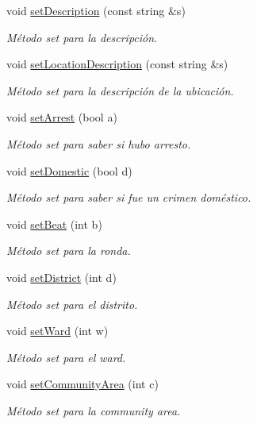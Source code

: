 \begin{DoxyCompactItemize}
void \hyperlink{classcrimen_a49fdeeb1b6376fd78bce80e42f670d43}{set\-Description} (const string \&s)
\begin{DoxyCompactList}\small\item\em Método set para la descripción. \end{DoxyCompactList}\item 
void \hyperlink{classcrimen_ad3bd97ed5867e3961a77f64a15797e41}{set\-Location\-Description} (const string \&s)
\begin{DoxyCompactList}\small\item\em Método set para la descripción de la ubicación. \end{DoxyCompactList}\item 
void \hyperlink{classcrimen_ae08b85470038469179a01ba753b7641a}{set\-Arrest} (bool a)
\begin{DoxyCompactList}\small\item\em Método set para saber si hubo arresto. \end{DoxyCompactList}\item 
void \hyperlink{classcrimen_a3ec14cf4bb0464350d8efd98d2679d41}{set\-Domestic} (bool d)
\begin{DoxyCompactList}\small\item\em Método set para saber si fue un crimen doméstico. \end{DoxyCompactList}\item 
void \hyperlink{classcrimen_a912becc826b6ab9ed5c29b8f28f9bd15}{set\-Beat} (int b)
\begin{DoxyCompactList}\small\item\em Método set para la ronda. \end{DoxyCompactList}\item 
void \hyperlink{classcrimen_a8693392c73b61f7846fa97aff5cafe69}{set\-District} (int d)
\begin{DoxyCompactList}\small\item\em Método set para el distrito. \end{DoxyCompactList}\item 
void \hyperlink{classcrimen_a62f79e2dc6e7bdf3dd790b94223581f6}{set\-Ward} (int w)
\begin{DoxyCompactList}\small\item\em Método set para el ward. \end{DoxyCompactList}\item 
void \hyperlink{classcrimen_a062f1a290d1229118492b5f911f0b8f5}{set\-Community\-Area} (int c)
\begin{DoxyCompactList}\small\item\em Método set para la community area. \end{DoxyCompactList}\item 

\end{DoxyCompactItemize}
